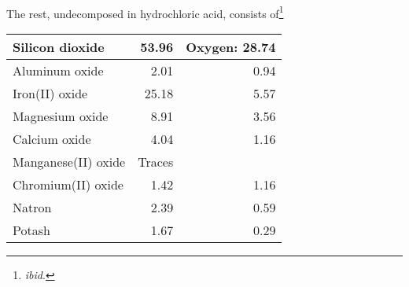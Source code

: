 \documentclass[a4paper, 12pt, oneside]{article}
\begin{document}
\paragraph*{}
The rest, undecomposed in hydrochloric acid, consists of\footnote{\emph{ibid}.}
\begin{center}
    \begin{tabular}{ |l|r|r| } 
    \hline
    Silicon dioxide & 53.96 & Oxygen: 28.74\\\hline
    Aluminum oxide & 2.01 & 0.94\\\hline
    Iron(II) oxide & 25.18 & 5.57\\\hline
    Magnesium oxide & 8.91 & 3.56\\\hline
    Calcium oxide & 4.04 & 1.16\\\hline
    Manganese(II) oxide & Traces &\\\hline
    Chromium(II) oxide & 1.42 & 1.16\\\hline
    Natron & 2.39 & 0.59\\\hline
    Potash & 1.67 & 0.29\\
    \hline
    \end{tabular}
\end{center}
\end{document}

